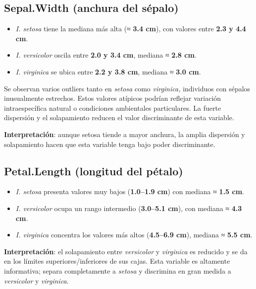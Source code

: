 \documentclass[
  spanish,
  11pt,
  a4paper,
  DIV=11,
  numbers=noendperiod]{scrartcl}
\providecommand{\tightlist}{%
  \setlength{\itemsep}{0pt}\setlength{\parskip}{0pt}}
\begin{document}
\subsection{Sepal.Width (anchura del
sépalo)}\label{sepal.width-anchura-del-suxe9palo}

\begin{itemize}
\item
  \emph{I. setosa} tiene la mediana más alta (≈ \textbf{3.4 cm}), con
  valores entre \textbf{2.3 y 4.4 cm}.
\item
  \emph{I. versicolor} oscila entre \textbf{2.0 y 3.4 cm}, mediana ≈
  \textbf{2.8 cm}.
\item
  \emph{I. virginica} se ubica entre \textbf{2.2 y 3.8 cm}, mediana ≈
  \textbf{3.0 cm}.
\end{itemize}

Se observan varios outliers tanto en \emph{setosa} como
\emph{virginica,} individuos con sépalos inusualmente estrechos. Estos
valores atípicos podrían reflejar variación intraespecífica natural o
condiciones ambientales particulares. La fuerte dispersión y el
solapamiento reducen el valor discriminante de esta variable.

\textbf{Interpretación}: aunque setosa tiende a mayor anchura, la amplia
dispersión y solapamiento hacen que esta variable tenga bajo poder
discriminante.

\subsection{Petal.Length (longitud del
pétalo)}\label{petal.length-longitud-del-puxe9talo}

\begin{itemize}
\tightlist
\item
  \emph{I. setosa} presenta valores muy bajos (\textbf{1.0--1.9 cm}) con
  mediana ≈ \textbf{1.5 cm}.\\
\item
  \emph{I. versicolor} ocupa un rango intermedio (\textbf{3.0--5.1 cm}),
  con mediana ≈ \textbf{4.3 cm}.\\
\item
  \emph{I. virginica} concentra los valores más altos (\textbf{4.5--6.9
  cm}), mediana ≈ \textbf{5.5 cm}.
\end{itemize}

\textbf{Interpretación}: el solapamiento entre \emph{versicolor} y
\emph{virginica} es reducido y se da en los límites
superiores/inferiores de sus cajas. Esta variable es altamente
informativa; separa completamente a \emph{setosa} y discrimina en gran
medida a \emph{versicolor} y \emph{virginica}.
\end{document}

